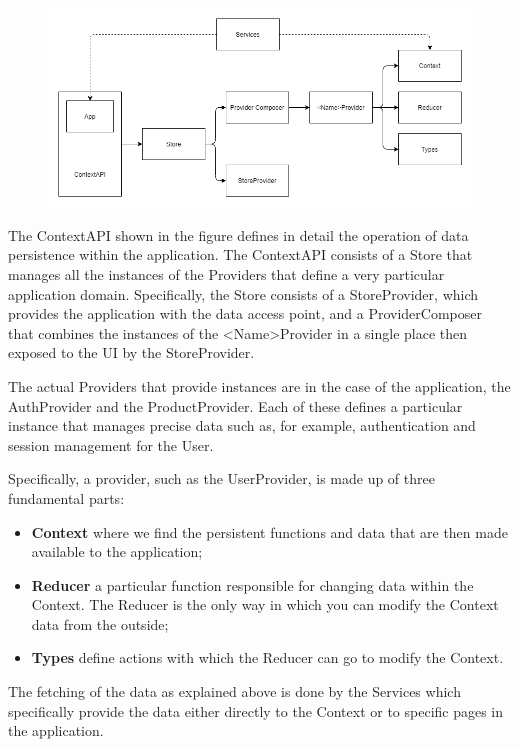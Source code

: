 \begin{figure}[H]
    \centering
    \includegraphics[width=45em]{res/images/frontend-diagrams/ContextAPI.png}
\end{figure}

The ContextAPI shown in the figure defines in detail the operation of data persistence within the application. The ContextAPI consists of a Store that manages all the instances of the Providers that define a very particular application domain. Specifically, the Store consists of a StoreProvider, which provides the application with the data access point, and a ProviderComposer that combines the instances of the <Name>Provider in a single place then exposed to the UI by the StoreProvider.

The actual Providers that provide instances are in the case of the application, the AuthProvider and the ProductProvider. Each of these defines a particular instance that manages precise data such as, for example, authentication and session management for the User.



Specifically, a provider, such as the UserProvider, is made up of three fundamental parts:

\begin{itemize}
    \item \textbf{Context} where we find the persistent functions and data that are then made available to the application;
    \item \textbf{Reducer} a particular function responsible for changing data within the Context. The Reducer is the only way in which you can modify the Context data from the outside; 
    \item \textbf{Types} define actions with which the Reducer can go to modify the Context.
\end{itemize}

The fetching of the data as explained above is done by the Services which specifically provide the data either directly to the Context or to specific pages in the application.

